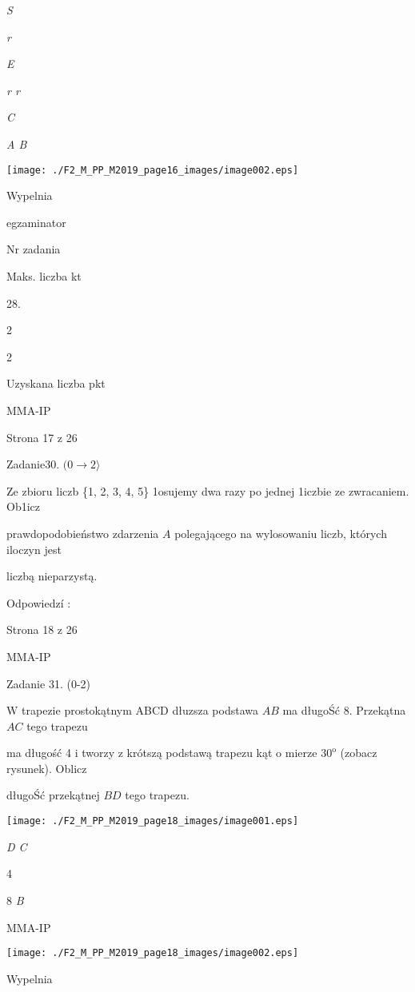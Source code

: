 \documentclass[a4paper,12pt]{article}
\begin{document}
{\it S}

{\it r}

{\it E}

{\it r  r}

{\it C}

{\it A  B}
\begin{center}
\texttt{[image: ./F2\_M\_PP\_M2019\_page16\_images/image002.eps]}
\end{center}
Wypelnia

egzaminator

Nr zadania

Maks. liczba kt

28.

2

2

Uzyskana liczba pkt

MMA-IP

Strona 17 z 26





Zadanie30. $(0\rightarrow 2\rangle$

Ze zbioru liczb \{1, 2, 3, 4, 5\} 1osujemy dwa razy po jednej 1iczbie ze zwracaniem. Ob1icz

prawdopodobieństwo zdarzenia $A$ polegającego na wylosowaniu liczb, których iloczyn jest

liczbą nieparzystą.

Odpowiedzí :

Strona 18 z 26

MMA-IP





Zadanie 31. (0-2)

$\mathrm{W}$ trapezie prostokątnym ABCD dłuzsza podstawa $AB$ ma długoŚć 8. Przekątna $AC$ tego trapezu

ma długość 4 i tworzy z krótszą podstawą trapezu kąt o mierze $30^{\mathrm{o}}$ (zobacz rysunek). Oblicz

długoŚć przekątnej $BD$ tego trapezu.
\begin{center}
\texttt{[image: ./F2\_M\_PP\_M2019\_page18\_images/image001.eps]}
\end{center}
{\it D  C}

4

8  {\it B}

MMA-IP
\begin{center}
\texttt{[image: ./F2\_M\_PP\_M2019\_page18\_images/image002.eps]}
\end{center}
Wypelnia
\end{document}
